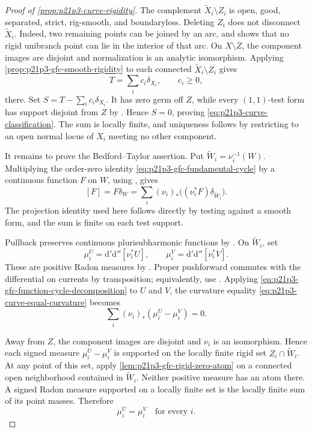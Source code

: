 \begin{proof}[Proof of \cref{prop:p21p3-curve-rigidity}]
The complement $\widetilde X_i\setminus Z_i$ is open, good, separated,
strict, rig-smooth, and boundaryless.  Deleting $Z_i$ does not disconnect
$\widetilde X_i$.  Indeed, two
remaining points can be joined by an arc, and
\cite[\S1.3.12]{Ducros24CurveStructure} shows that no rigid unibranch
point can lie in the interior of that arc.  On $X\setminus Z$, the component
images are disjoint and normalization is an analytic isomorphism.
Applying \cref{prop:p21p3-gfc-smooth-rigidity} to each connected
$\widetilde X_i\setminus Z_i$ gives
\[
                         T=\sum_i c_i\delta_{X_i},
                         \qquad c_i\geq0,
\]
there.  Set $S=T-\sum_i c_i\delta_{X_i}$.  It has zero germ off $Z$,
while every $(1,1)$-test form has support disjoint from $Z$ by
\cite[Proposition~3.3.6]{CLD25}.  Hence $S=0$, proving
\eqref{eq:p21p3-curve-classification}.  The sum is locally finite,
and uniqueness follows by restricting to an open normal locus of $X_i$
meeting no other component.

It remains to prove the Bedford--Taylor assertion.  Put
$\widetilde W_i=\nu_i^{-1}(W)$.  Multiplying the order-zero identity
\eqref{eq:p21p3-gfc-fundamental-cycle} by a continuous function $F$ on
$W$, using \cite[Example~7.2.12]{CLD25}, gives
\begin{equation}
\label{eq:p21p3-gfc-function-cycle-decomposition}
 [F]=F\delta_W
     =\sum_i(\nu_i)_*
        \bigl((\nu_i^*F)\delta_{\widetilde W_i}\bigr).
\end{equation}
The projection identity used here follows directly by testing against a
smooth form, and the sum is finite on each test support.

Pullback preserves continuous plurisubharmonic functions by
\cite[Proposition~8.1.5]{CLD25}.  On $\widetilde W_i$, set
\[
 \mu_i^U=\mathrm d'\mathrm d''[\nu_i^*U],
 \qquad
 \mu_i^V=\mathrm d'\mathrm d''[\nu_i^*V].
\]
These are positive Radon measures by \cite[Lemma~8.5.5]{CLD25}.
Proper pushforward commutes with the differential on currents by
transposition; equivalently, use \cite[Proposition~8.5.6]{CLD25}.
Applying \eqref{eq:p21p3-gfc-function-cycle-decomposition} to $U$ and
$V$, the curvature equality
\eqref{eq:p21p3-curve-equal-curvature} becomes
\begin{equation}
\label{eq:p21p3-gfc-component-measure-sum}
                    \sum_i(\nu_i)_*(\mu_i^U-\mu_i^V)=0.
\end{equation}

Away from $Z$, the component images are disjoint and $\nu_i$ is an
isomorphism.  Hence each signed measure $\mu_i^U-\mu_i^V$ is supported
on the locally finite rigid set $Z_i\cap\widetilde W_i$.  At any point of
this set, apply \cref{lem:p21p3-gfc-rigid-zero-atom} on a connected open
neighborhood contained in $\widetilde W_i$.  Neither positive measure has
an atom there.  A signed Radon measure supported on a locally finite set
is the locally finite sum of its point masses.  Therefore
\begin{equation}
\label{eq:p21p3-gfc-component-measure-equality}
                              \mu_i^U=\mu_i^V
                              \quad\text{for every }i.
\end{equation}


\end{proof}
